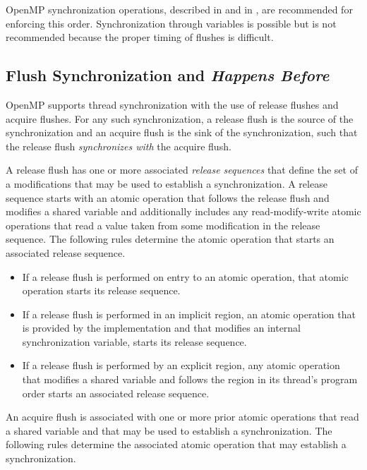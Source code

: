 \begin{note}
OpenMP synchronization operations, described in 
 and in 
, are recommended for enforcing this 
order. Synchronization through variables is possible but is not 
recommended because the proper timing of flushes is difficult.
\end{note}


\subsection{Flush Synchronization and \emph{Happens Before}}
\label{subsec:happens-before}

OpenMP supports thread synchronization with the use of release flushes and
acquire flushes. For any such synchronization, a release flush is the source
of the synchronization and an acquire flush is the sink of the
synchronization, such that the release flush \emph{synchronizes with} the
acquire flush.

A release flush has one or more associated \emph{release sequences} that
define the set of a modifications that may be used to establish a
synchronization. A release sequence starts with an atomic operation
that follows the release flush and modifies a shared variable and additionally
includes any read-modify-write atomic operations that read a value taken from
some modification in the release sequence. The following rules determine the 
atomic operation that starts an associated release sequence.

\begin{itemize}
\item If a release flush is performed on entry to an atomic operation, that
    atomic operation starts its release sequence.
\item If a release flush is performed in an implicit  region, an 
    atomic operation that is provided by the implementation and that modifies
    an internal synchronization variable, starts its release sequence.
\item If a release flush is performed by an explicit  region, any
    atomic operation that modifies a shared variable and follows the
     region in its thread's program order starts an associated
    release sequence.
\end{itemize}

An acquire flush is associated with one or more prior atomic operations that
read a shared variable and that may be used to establish a synchronization.
The following rules determine the associated atomic operation that may 
establish a synchronization.

